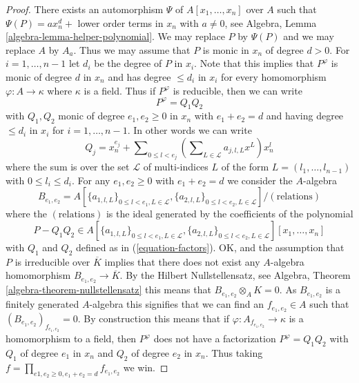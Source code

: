 \begin{proof}
There exists an automorphism $\Psi$ of $A[x_1, \ldots, x_n]$ over $A$
such that $\Psi(P) = ax_n^d +$ lower order terms in $x_n$ with
$a \not = 0$, see
Algebra, Lemma \ref{algebra-lemma-helper-polynomial}.
We may replace $P$ by $\Psi(P)$ and we may replace $A$ by $A_a$.
Thus we may assume that $P$ is monic in $x_n$ of degree $d > 0$.
For $i = 1, \ldots, n - 1$ let $d_i$ be the degree of $P$ in $x_i$.
Note that this implies that $P^\varphi$ is monic of degree $d$ in $x_n$
and has degree $\leq d_i$ in $x_i$ for every homomorphism
$\varphi : A \to \kappa$ where $\kappa$ is a field.
Thus if $P^\varphi$ is reducible, then we can write
$$
P^\varphi = Q_1 Q_2
$$
with $Q_1, Q_2$ monic of degree $e_1, e_2 \geq 0$ in $x_n$ with
$e_1 + e_2 = d$ and having degree $\leq d_i$ in $x_i$ for
$i = 1, \ldots, n - 1$. In other words we can write
\begin{equation}
\label{equation-factors}
Q_j = x_n^{e_j} + \sum\nolimits_{0 \leq l < e_j}
\left( \sum\nolimits_{L \in \mathcal{L}} a_{j, l, L} x^L \right) x_n^l
\end{equation}
where the sum is over the set $\mathcal{L}$ of multi-indices $L$
of the form $L = (l_1, \ldots, l_{n - 1})$ with $0 \leq l_i \leq d_i$.
For any $e_1, e_2 \geq 0$ with $e_1 + e_2 = d$ we consider the $A$-algebra
$$
B_{e_1, e_2} =
A[\{a_{1, l, L}\}_{0 \leq l < e_1, L \in \mathcal{L}},
\{a_{2, l, L}\}_{0 \leq l < e_2, L \in \mathcal{L}}]/(\text{relations})
$$
where the $(\text{relations})$ is the ideal generated by the coefficients
of the polynomial
$$
P - Q_1Q_2 \in
A[\{a_{1, l, L}\}_{0 \leq l < e_1, L \in \mathcal{L}},
\{a_{2, l, L}\}_{0 \leq l < e_2, L \in \mathcal{L}}][x_1, \ldots, x_n]
$$
with $Q_1$ and $Q_2$ defined as in (\ref{equation-factors}). OK, and
the assumption that $P$ is irreducible over $\overline{K}$ implies that
there does not exist any $A$-algebra homomorphism
$B_{e_1, e_2} \to \overline{K}$. By the Hilbert Nullstellensatz, see
Algebra, Theorem \ref{algebra-theorem-nullstellensatz}
this means that $B_{e_1, e_2} \otimes_A K = 0$.
As $B_{e_1, e_2}$ is a finitely generated $A$-algebra this signifies that
we can find an $f_{e_1, e_2} \in A$ such that
$(B_{e_1, e_2})_{f_{e_1, e_2}} = 0$. By construction this means that
if $\varphi : A_{f_{e_1, e_2}} \to \kappa$ is a homomorphism to a field,
then $P^\varphi$ does not have a factorization $P^\varphi = Q_1 Q_2$
with $Q_1$ of degree $e_1$ in $x_n$ and $Q_2$ of degree $e_2$ in $x_n$.
Thus taking
$f = \prod_{e1, e_2 \geq 0, e_1 + e_2 = d} f_{e_1, e_2}$ we win.
\end{proof}

